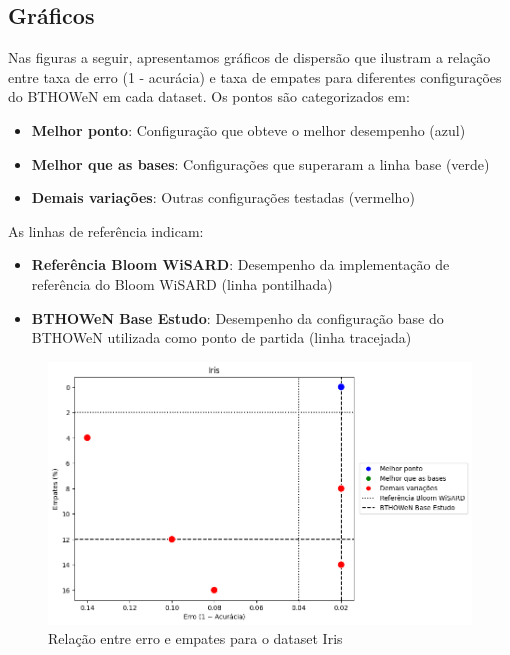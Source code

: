 \documentclass{article}
\begin{document}
\subsection{Gráficos}

Nas figuras a seguir, apresentamos gráficos de dispersão que ilustram a relação entre taxa de erro (1 - acurácia) e taxa de empates para diferentes configurações do BTHOWeN em cada dataset. Os pontos são categorizados em:

\begin{itemize}
  \item \textbf{Melhor ponto}: Configuração que obteve o melhor desempenho (azul)
  \item \textbf{Melhor que as bases}: Configurações que superaram a linha base (verde)
  \item \textbf{Demais variações}: Outras configurações testadas (vermelho)
\end{itemize}

As linhas de referência indicam:
\begin{itemize}
  \item \textbf{Referência Bloom WiSARD}: Desempenho da implementação de referência do Bloom WiSARD (linha pontilhada)
  \item \textbf{BTHOWeN Base Estudo}: Desempenho da configuração base do BTHOWeN utilizada como ponto de partida (linha tracejada)
\end{itemize}


\begin{figure}[H]
\centering
\includegraphics[width=1.1\textwidth]{figures/image1.png}
\caption{Relação entre erro e empates para o dataset Iris}
\label{fig:iris}
\end{figure}
\end{document}

